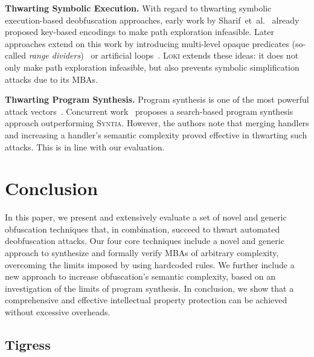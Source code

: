 \documentclass[letterpaper,twocolumn,10pt]{article}
\newcommand{\etal}{et~al.\xspace}
\theoremstyle{customexample}
\theoremstyle{customexperiment}
\newcommand{\loki}{\textsc{Loki}\xspace}
\newcommand{\syntia}{\textsc{Syntia}\xspace}
\begin{document}
\textbf{Thwarting Symbolic Execution.}
With regard to thwarting symbolic execution-based deobfuscation approaches, early work by Sharif~\etal~\cite{sharif2008impeding} already proposed key-based encodings to make path exploration infeasible. Later approaches extend on this work by introducing multi-level opaque predicates (so-called \emph{range dividers})~\cite{banescu2016code} or artificial loops~\cite{ollivier2019howto}.
\loki extends these ideas: it does not only make path exploration infeasible, but also prevents symbolic simplification attacks due to its MBAs.

\textbf{Thwarting Program Synthesis.}
Program synthesis is one of the most powerful attack vectors~\cite{blazytko2017syntia,menguy2021xyntia}. 
Concurrent work~\cite{menguy2021xyntia} proposes a search-based program synthesis approach outperforming \syntia. However, the authors note that merging handlers and increasing a handler's semantic complexity proved effective in thwarting such attacks. This is in line with our evaluation.









 \section{Conclusion}

In this paper, we present and extensively evaluate a set of novel and generic obfuscation techniques that, in combination, succeed to thwart automated deobfuscation attacks. Our four core techniques include a novel and generic approach to synthesize and formally verify MBAs of arbitrary complexity, overcoming the limits imposed by using hardcoded rules. We further include a new approach to increase obfuscation's semantic complexity, based on an investigation of the limits of program synthesis.
In conclusion, we show that a comprehensive and effective intellectual property protection can be achieved without excessive overheads.
 







\subsection{Tigress}\label{sec:appendix:tigress}

\end{document}
